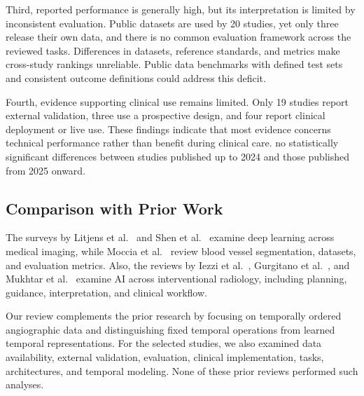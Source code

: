Third, reported performance is generally high, but its interpretation is limited by inconsistent evaluation. Public datasets are used by 20 studies, yet only three release their own data, and there is no common evaluation framework across the reviewed tasks. Differences in datasets, reference standards, and metrics make cross-study rankings unreliable. Public data benchmarks with defined test sets and consistent outcome definitions could address this deficit.

Fourth, evidence supporting clinical use remains limited. Only 19 studies report external validation, three use a prospective design, and four report clinical deployment or live use. These findings indicate that most evidence concerns technical performance rather than benefit during clinical care.  no statistically significant differences between studies published up to 2024 and those published from 2025 onward. 


\subsection{Comparison with Prior Work}

The surveys by Litjens et al.~\cite{Litjens2017} and Shen et al.~\cite{Shen2017} examine deep learning across medical imaging, while Moccia et al.~\cite{Moccia2018} review blood vessel segmentation, datasets, and evaluation metrics. Also, the reviews by Iezzi et al.~\cite{Iezzi2019}, Gurgitano et al.~\cite{Gurgitano2021}, and Mukhtar et al.~\cite{Mukhtar2025} examine AI across interventional radiology, including planning, guidance, interpretation, and clinical workflow.



Our review complements the prior research by focusing on temporally ordered angiographic data and distinguishing fixed temporal operations from learned temporal representations. For the selected studies, we also examined data availability, external validation, evaluation, clinical implementation, tasks, architectures, and temporal modeling. None of these prior reviews performed such analyses.

